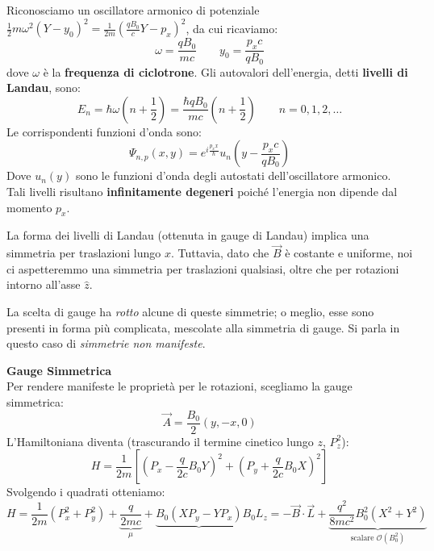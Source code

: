 
Riconosciamo un oscillatore armonico di potenziale \( \frac{1}{2} m \omega^2 (Y - y_0)^2 = \frac{1}{2m} \left( \frac{q B_0}{c} Y - p_x \right)^2 \), da cui ricaviamo:
\begin{equation}
    \omega = \frac{q B_0}{m c} \qquad y_0 = \frac{p_x c}{q B_0}
\end{equation}
dove \( \omega \) è la \textbf{frequenza di ciclotrone}. Gli autovalori dell'energia, detti \textbf{livelli di Landau}, sono:
\begin{equation}
    E_n = \hbar \omega \left( n + \frac{1}{2} \right) = \frac{\hbar q B_0}{m c} \left( n + \frac{1}{2} \right) \qquad n = 0, 1, 2, \dots
\end{equation}
Le corrispondenti funzioni d'onda sono:
\begin{equation}
    \Psi_{n, p}(x, y) = e^{i \frac{p_x x}{\hbar}} u_n \left( y - \frac{p_x c}{q B_0} \right)
\end{equation} 
Dove \(u_n(y) \) sono le funzioni d'onda degli autostati dell'oscillatore armonico.
Tali livelli risultano \textbf{infinitamente degeneri} poiché l'energia non dipende dal momento \( p_x \).

La forma dei livelli di Landau (ottenuta in gauge di Landau) implica una simmetria per traslazioni lungo \( x \). Tuttavia, dato che \( \vec{B} \) è costante e uniforme, noi ci aspetteremmo una simmetria per traslazioni qualsiasi, oltre che per rotazioni intorno all'asse \( \hat{z} \).

La scelta di gauge ha \textit{rotto} alcune di queste simmetrie; o meglio, esse sono presenti in forma più complicata, mescolate alla simmetria di gauge. Si parla in questo caso di \textit{simmetrie non manifeste}.

\begin{example}
    \textbf{Gauge Simmetrica}\\
    Per rendere manifeste le proprietà per le rotazioni, scegliamo la gauge simmetrica:
    \begin{equation}
        \vec{A} = \frac{B_0}{2} (y, -x, 0)
    \end{equation}
    L'Hamiltoniana diventa (trascurando il termine cinetico lungo \( z \), \( P_z^2 \)):
    \[
        H = \frac{1}{2m} \left[ \left( P_x - \frac{q}{2c} B_0 Y \right)^2 + \left( P_y + \frac{q}{2c} B_0 X \right)^2 \right]
    \]
    Svolgendo i quadrati otteniamo:
    \[
        H = \frac{1}{2m} (P_x^2 + P_y^2) + \underbrace{\frac{q}{2mc} }_{\mu}+ \underbrace{B_0 (X P_y - Y P_x)}{B_0L_z= -\vec{B}\cdot\vec{L}} + \underbrace{\frac{q^2}{8mc^2} B_0^2 (X^2 + Y^2)}_{\text{scalare } \mathcal{O}(B_0^2)}
    \]
\end{example}

